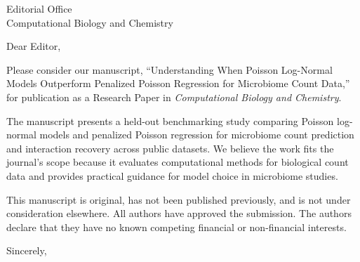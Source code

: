 \documentclass[11pt]{letter}
\date{May 3, 2026}
\begin{document}
\begin{letter}{Editorial Office\\Computational Biology and Chemistry}
\opening{Dear Editor,}

Please consider our manuscript, ``Understanding When Poisson Log-Normal Models Outperform Penalized Poisson Regression for Microbiome Count Data,'' for publication as a Research Paper in \emph{Computational Biology and Chemistry}.

The manuscript presents a held-out benchmarking study comparing Poisson log-normal models and penalized Poisson regression for microbiome count prediction and interaction recovery across public datasets. We believe the work fits the journal's scope because it evaluates computational methods for biological count data and provides practical guidance for model choice in microbiome studies.

This manuscript is original, has not been published previously, and is not under consideration elsewhere. All authors have approved the submission. The authors declare that they have no known competing financial or non-financial interests.

\closing{Sincerely,}
\end{letter}
\end{document}
